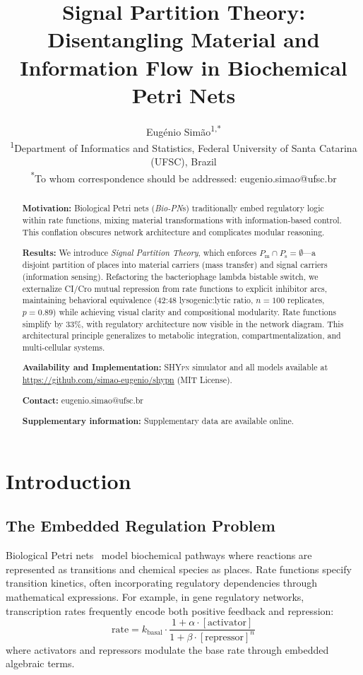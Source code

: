 \documentclass[twocolumn,10pt]{article}
\title{\textbf{Signal Partition Theory: Disentangling Material and Information Flow in Biochemical Petri Nets}}
\author{
Eugénio Simão\textsuperscript{1,*}\\
\textsuperscript{1}Department of Informatics and Statistics, Federal University of Santa Catarina (UFSC), Brazil\\
\textsuperscript{*}To whom correspondence should be addressed: eugenio.simao@ufsc.br
}
\date{}
\newcommand{\biopn}{\textit{Bio-PN}}
\newcommand{\Pm}{P_{\text{m}}}
\newcommand{\Ps}{P_{\text{s}}}
\newcommand{\shypn}{\textsc{SHYpn}}
\begin{document}
\maketitle

\begin{abstract}
\textbf{Motivation:} Biological Petri nets (\biopn{s}) traditionally embed regulatory logic within rate functions, mixing material transformations with information-based control. This conflation obscures network architecture and complicates modular reasoning.

\textbf{Results:} We introduce \textit{Signal Partition Theory}, which enforces $\Pm \cap \Ps = \emptyset$---a disjoint partition of places into material carriers (mass transfer) and signal carriers (information sensing). Refactoring the bacteriophage lambda bistable switch, we externalize CI/Cro mutual repression from rate functions to explicit inhibitor arcs, maintaining behavioral equivalence (42:48 lysogenic:lytic ratio, $n=100$ replicates, $p=0.89$) while achieving visual clarity and compositional modularity. Rate functions simplify by 33\%, with regulatory architecture now visible in the network diagram. This architectural principle generalizes to metabolic integration, compartmentalization, and multi-cellular systems.

\textbf{Availability and Implementation:} \shypn{} simulator and all models available at \url{https://github.com/simao-eugenio/shypn} (MIT License).

\textbf{Contact:} eugenio.simao@ufsc.br

\textbf{Supplementary information:} Supplementary data are available online.
\end{abstract}

\section{Introduction}

\subsection{The Embedded Regulation Problem}

Biological Petri nets~\cite{reddy1993petri,hardy2004modeling} model biochemical pathways where reactions are represented as transitions and chemical species as places. Rate functions specify transition kinetics, often incorporating regulatory dependencies through mathematical expressions. For example, in gene regulatory networks, transcription rates frequently encode both positive feedback and repression:
%
\begin{equation}
\text{rate} = k_{\text{basal}} \cdot \frac{1 + \alpha \cdot [\text{activator}]}{1 + \beta \cdot [\text{repressor}]^n}
\label{eq:embedded}
\end{equation}
%
where activators and repressors modulate the base rate through embedded algebraic terms.
\end{document}

